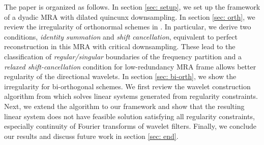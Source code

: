 The paper is organized as follows. In section \ref{sec: setup}, we set up the framework of a dyadic MRA with dilated quincunx downsampling. In section \ref{sec: orth}, we review the irregularity of orthonormal schemes in \cite{yin2014orthshear}. In particular, we derive two conditions, {\it identity summation} and {\it shift cancellation}, equivalent to perfect reconstruction in this MRA with critical downsampling. These lead to the classification of {\it regular/singular} boundaries of the frequency partition %
and a {\it relaxed shift-cancellation} condition for low-redundancy MRA frame allows better regularity of the directional wavelets. 
In section \ref{sec: bi-orth}, we show the irregularity for bi-orthogonal schemes. We first review the wavelet construction algorithm from \cite{cohen1993compactly} which solves linear systems generated from regularity constraints. Next, we extend the algorithm to our framework and show that the resulting linear system does not have feasible solution satisfying all regularity constraints, especially continuity of Fourier transforms of wavelet filters.  
Finally, we conclude our results and discuss future work in section \ref{sec: end}.
